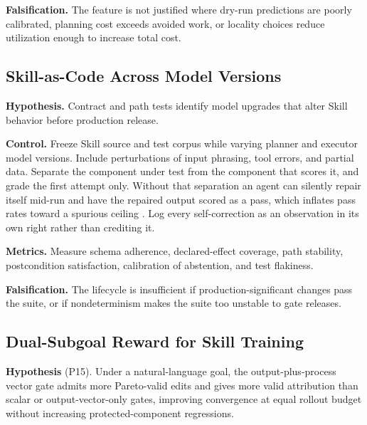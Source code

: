 \textbf{Falsification.} The feature is not justified where dry-run predictions are poorly calibrated, planning cost exceeds avoided work, or locality choices reduce utilization enough to increase total cost.

\subsection{Skill-as-Code Across Model Versions}
\label{sec:eval-modelversion}

\textbf{Hypothesis.} Contract and path tests identify model upgrades that alter Skill behavior before production release.

\textbf{Control.} Freeze Skill source and test corpus while varying planner and executor model versions. Include perturbations of input phrasing, tool errors, and partial data. Separate the component under test from the component that scores it, and grade the first attempt only. Without that separation an agent can silently repair itself mid-run and have the repaired output scored as a pass, which inflates pass rates toward a spurious ceiling \cite{anand2026aeval}. Log every self-correction as an observation in its own right rather than crediting it.

\textbf{Metrics.} Measure schema adherence, declared-effect coverage, path stability, postcondition satisfaction, calibration of abstention, and test flakiness.

\textbf{Falsification.} The lifecycle is insufficient if production-significant changes pass the suite, or if nondeterminism makes the suite too unstable to gate releases.

\subsection{Dual-Subgoal Reward for Skill Training}
\label{sec:eval-dual-subgoal}

\textbf{Hypothesis} (P15). Under a natural-language goal, the output-plus-process vector gate admits more Pareto-valid edits and gives more valid attribution than scalar or output-vector-only gates, improving convergence at equal rollout budget without increasing protected-component regressions.

